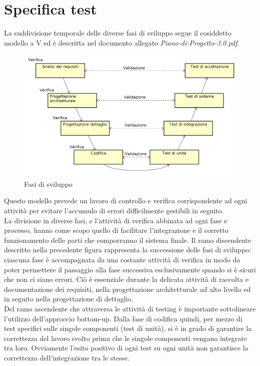 \documentclass[a4paper,11pt]{article}
\begin{document}
\newpage
\section{Specifica test}
\label{Appendice B} 
La suddivisione temporale delle diverse fasi di sviluppo segue il cosiddetto modello a V ed è descritta nel documento allegato \textit{Piano-di-Progetto-3.0.pdf}.
\begin{figure}[h!]
\centering
\includegraphics[scale=0.4]{../../images/vmodel-final4.png}
\caption{Fasi di sviluppo}
\end{figure} 
Questo modello prevede un lavoro di controllo e verifica corrispondente ad ogni attività per evitare l'accumulo di errori difficilmente gestibili in seguito.\\
La divisione in diverse fasi, e l'attività di verifica abbinata ad ogni fase e processo, hanno come scopo quello di facilitare l'integrazione e il corretto funzionamento delle parti che comporranno il sistema finale.
Il ramo discendente descritto nella precedente figura rappresenta la successione delle fasi di sviluppo: ciascuna fase è accompagnata da una costante attività di verifica in modo da poter permettere il passaggio alla fase successiva esclusivamente quando si è sicuri che non ci siano errori. Ciò è essenziale durante la delicata attività di raccolta e documentazione dei requisiti, nella progettazione architetturale ad alto livello ed in seguito nella progettazione di dettaglio.\\ 
Del ramo ascendente che attraversa le attività di testing è importante sottolineare l'utilizzo dell'approccio bottom-up.
Dalla fase di codifica quindi, per mezzo di test specifici sulle singole componenti (test di unità), si è in grado di garantire la correttezza del lavoro svolto prima che le singole componenti vengano integrate tra loro. Ovviamente l'esito positivo di ogni test su ogni unità non garantisce la correttezza dell'integrazione tra le stesse. \\
\end{document}
